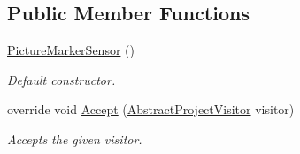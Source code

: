 \subsection*{Public Member Functions}
\begin{DoxyCompactItemize}
\item 
\hyperlink{class_a_rdev_kit_1_1_model_1_1_project_1_1_picture_marker_sensor_aea8684c1fd22cddc40171808db321e11}{Picture\-Marker\-Sensor} ()
\begin{DoxyCompactList}\small\item\em Default constructor. \end{DoxyCompactList}\item 
override void \hyperlink{class_a_rdev_kit_1_1_model_1_1_project_1_1_picture_marker_sensor_a4c36ac6cf5bd103a418b5ae21492b70a}{Accept} (\hyperlink{class_a_rdev_kit_1_1_controller_1_1_project_controller_1_1_abstract_project_visitor}{Abstract\-Project\-Visitor} visitor)
\begin{DoxyCompactList}\small\item\em Accepts the given visitor. \end{DoxyCompactList}\end{DoxyCompactItemize}
